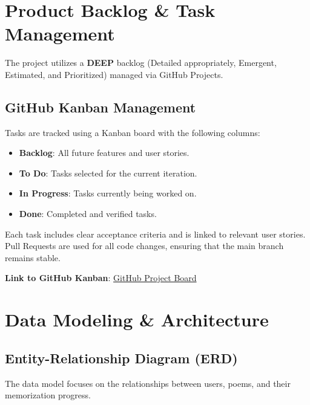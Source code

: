 \documentclass[12pt,a4paper]{article}
\begin{document}
\newpage
\section{Product Backlog \& Task Management}
The project utilizes a \textbf{DEEP} backlog (Detailed appropriately, Emergent, Estimated, and Prioritized) managed via GitHub Projects.

\subsection{GitHub Kanban Management}
Tasks are tracked using a Kanban board with the following columns:
\begin{itemize}
    \item \textbf{Backlog}: All future features and user stories.
    \item \textbf{To Do}: Tasks selected for the current iteration.
    \item \textbf{In Progress}: Tasks currently being worked on.
    \item \textbf{Done}: Completed and verified tasks.
\end{itemize}

Each task includes clear acceptance criteria and is linked to relevant user stories. Pull Requests are used for all code changes, ensuring that the main branch remains stable.

\textbf{Link to GitHub Kanban}: \href{https://github.com/Potter32111/poetry-recommender/projects}{GitHub Project Board}

\newpage
\section{Data Modeling \& Architecture}

\subsection{Entity-Relationship Diagram (ERD)}
The data model focuses on the relationships between users, poems, and their memorization progress.
\end{document}
